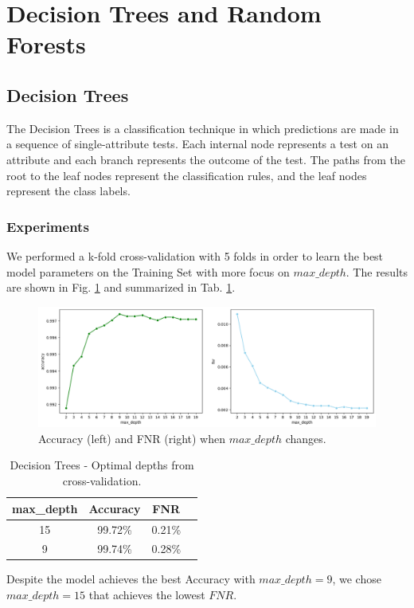 \documentclass[twocolumn, switch]{article} %
\newcommand\x{0.7}
\begin{document}
\section{Decision Trees and Random Forests}
\label{sec:tree}
\subsection{Decision Trees}
The Decision Trees is a classification technique in which predictions are made in a sequence of single-attribute tests.
Each internal node represents a test on an attribute and each branch represents the outcome of the test. The paths from the root to the leaf nodes represent the classification rules, and the leaf nodes represent the class labels.
\subsubsection{Experiments}
\label{sub:tree}
We performed a k-fold cross-validation with 5 folds in order to learn the best model parameters on the Training Set with more focus on $max\_depth$. The results are shown in Fig. \ref{fig:treetrain} and summarized in Tab. \ref{tab:treetrain}.
\begin{figure}[ht!]
	\centering
	\includegraphics[width=\x\linewidth]{tree_accuracy_fnr.png}
	\caption{Accuracy (left) and FNR (right) when $max\_depth$ changes.}
	\label{fig:treetrain}
\end{figure}

\begin{table}[ht!]
	\centering
	{\small
		\begin{tabular}{|c|c|c|c|}
			\hline
			\textbf{max\_depth} & \textbf{Accuracy} & \textbf{FNR} \\ \hline
			15                 & 99.72\%           & 0.21\%       \\ \hline
			9                  & 99.74\%           & 0.28\%       \\ \hline
		\end{tabular}
		\vspace{1mm}
		\caption{Decision Trees - Optimal depths from cross-validation.}
		\label{tab:treetrain}
		\vspace{-5mm}
	}
\end{table}
Despite the model achieves the best Accuracy with $max\_depth = 9$, we chose $max\_depth = 15$ that achieves the lowest $FNR$.
\end{document}
